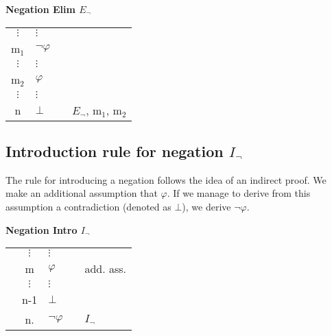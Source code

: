 \documentclass[nobib,nofonts]{tufte-handout}
\begin{document}
\bigskip
\noindent \colorbox{mygray!60}{\centering
  \begin{minipage}[t]{0.35\linewidth}
    \textbf{Negation Elim $E_{\neg}$}
  \end{minipage}
  \begin{minipage}[t]{0.55\linewidth}
    \begin{tabular}{clcl}
            $\vdots$ & $\vdots$       & \\
      m$_{1}$        & $\neg \varphi$ &  \\
            $\vdots$ & $\vdots$       & \\
      m$_{2}$        & $\varphi$      &  \\
            $\vdots$ & $\vdots$       & \\
      n             & $\bot$         & & $E_{\neg}$, m$_{1}$, m$_{2}$
    \end{tabular}
  \end{minipage}
}
\bigskip

\subsection{Introduction rule for negation $I_{\neg}$}

The rule for introducing a negation follows the idea of an indirect proof.
We make an additional assumption that $\varphi$.
If we manage to derive from this assumption a contradiction (denoted as $\bot$), we derive $\neg \varphi$.

\bigskip
\noindent \colorbox{mygray!60}{\centering
  \begin{minipage}[t]{0.35\linewidth}
    \textbf{Negation Intro $I_{\neg}$}
  \end{minipage}
  \begin{minipage}[t]{0.55\linewidth}
    \begin{tabular}{cclcl}
                         &                   $\vdots$ & $\vdots$       & \\
      \cline{1-2} \vline & m                          & $\varphi$      & & add. ass.  \\
      \vline             &                   $\vdots$ & $\vdots$       & \\
      \vline             & n-1                        & $\bot$         & & \\ \hline
                         & n.                         & $\neg \varphi$ & & $I_{\neg}$
    \end{tabular}
  \end{minipage}
}
\bigskip
\end{document}
